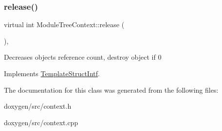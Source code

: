 \mbox{\label{class_module_tree_context_a3e9934215083fbf3ae3cb5c65ecad344}} 
\subsubsection{\texorpdfstring{release()}{release()}}
{\footnotesize\ttfamily virtual int Module\+Tree\+Context\+::release (\begin{DoxyParamCaption}{ }\end{DoxyParamCaption})\hspace{0.3cm}{\ttfamily [inline]}, {\ttfamily [virtual]}}

Decreases object\textquotesingle{}s reference count, destroy object if 0 

Implements \mbox{\hyperlink{class_template_struct_intf_a3dce7dd29d3f66a8080b40578e8a5045}{Template\+Struct\+Intf}}.



The documentation for this class was generated from the following files\+:\begin{DoxyCompactItemize}
\item 
doxygen/src/context.\+h\item 
doxygen/src/context.\+cpp\end{DoxyCompactItemize}
